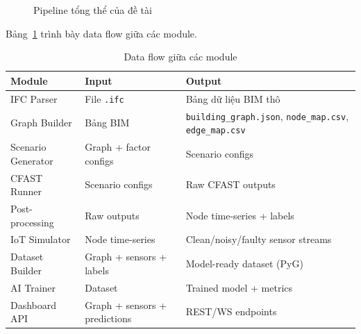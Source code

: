 \begin{figure}[htbp]
\caption{Pipeline tổng thể của đề tài}
\label{fig:pipeline}
\end{figure}

Bảng~\ref{tab:dataflow} trình bày data flow giữa các module.

\begin{table}[H]
\centering
\caption{Data flow giữa các module}
\label{tab:dataflow}
\begin{tabularx}{\textwidth}{l l X}
\toprule
\textbf{Module} & \textbf{Input} & \textbf{Output} \\
\midrule
IFC Parser        & File \texttt{.ifc}       & Bảng dữ liệu BIM thô \\
Graph Builder     & Bảng BIM                  & \texttt{building\_graph.json}, \texttt{node\_map.csv}, \texttt{edge\_map.csv} \\
Scenario Generator & Graph + factor configs   & Scenario configs \\
CFAST Runner      & Scenario configs           & Raw CFAST outputs \\
Post-processing   & Raw outputs                & Node time-series + labels \\
IoT Simulator     & Node time-series           & Clean/noisy/faulty sensor streams \\
Dataset Builder   & Graph + sensors + labels   & Model-ready dataset (PyG) \\
AI Trainer        & Dataset                    & Trained model + metrics \\
Dashboard API     & Graph + sensors + predictions & REST/WS endpoints \\
\bottomrule
\end{tabularx}
\end{table}

